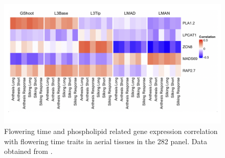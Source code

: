 \documentclass[9pt,twocolumn,twoside,lineno]{BioRxiv}
\begin{document}
\begin{figure}[t]
\begin{center}
\includegraphics[width=0.8\paperwidth]{Sup_Figures/Sup_Fig_8.png}
\caption{Flowering time and phospholipid related gene expression correlation with flowering time traits in aerial tissues in the 282 panel. 
Data obtained from \cite{Kremling2018-gn}.
}
\label{SupFig8}
\end{center}
\end{figure} 
\end{document}
